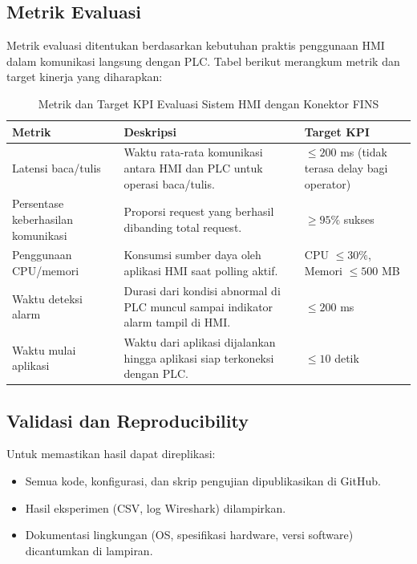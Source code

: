 \subsection{Metrik Evaluasi}
Metrik evaluasi ditentukan berdasarkan kebutuhan praktis penggunaan HMI dalam komunikasi langsung dengan PLC. 
Tabel berikut merangkum metrik dan target kinerja yang diharapkan:

\begin{table}[H]
    \centering
    \begin{tabular}{|p{4cm}|p{5cm}|p{5cm}|}
        \hline
        \textbf{Metrik} & \textbf{Deskripsi} & \textbf{Target KPI} \\
        \hline
        Latensi baca/tulis & Waktu rata-rata komunikasi antara HMI dan PLC untuk operasi baca/tulis. & $\leq 200$ ms (tidak terasa delay bagi operator) \\
        \hline
        Persentase keberhasilan komunikasi & Proporsi request yang berhasil dibanding total request. & $\geq 95\%$ sukses \\
        \hline
        Penggunaan CPU/memori & Konsumsi sumber daya oleh aplikasi HMI saat polling aktif. & CPU $\leq 30\%$, Memori $\leq 500$ MB \\
        \hline
        Waktu deteksi alarm & Durasi dari kondisi abnormal di PLC muncul sampai indikator alarm tampil di HMI. & $\leq 200$ ms \\
        \hline
        Waktu mulai aplikasi & Waktu dari aplikasi dijalankan hingga aplikasi siap terkoneksi dengan PLC. & $\leq 10$ detik \\
        \hline
    \end{tabular}
    \caption{Metrik dan Target KPI Evaluasi Sistem HMI dengan Konektor FINS}
\end{table}


\subsection{Validasi dan Reproducibility}
Untuk memastikan hasil dapat direplikasi:
\begin{itemize}
    \item Semua kode, konfigurasi, dan skrip pengujian dipublikasikan di GitHub.
    \item Hasil eksperimen (CSV, log Wireshark) dilampirkan.
    \item Dokumentasi lingkungan (OS, spesifikasi hardware, versi software) dicantumkan di lampiran.
\end{itemize}

